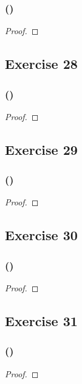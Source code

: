 \documentclass[14pt]{extarticle}
\begin{document}
\subsubsection{()}

\begin{proof}

\end{proof}

\subsection{Exercise 28}

\subsubsection{()}

\begin{proof}

\end{proof}

\subsection{Exercise 29}

\subsubsection{()}

\begin{proof}

\end{proof}

\subsection{Exercise 30}

\subsubsection{()}

\begin{proof}

\end{proof}

\subsection{Exercise 31}

\subsubsection{()}

\begin{proof}

\end{proof}
\end{document}
